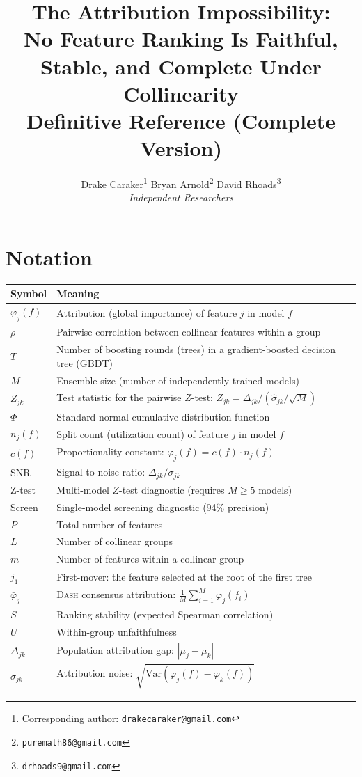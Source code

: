 \documentclass{article}
\title{The Attribution Impossibility:\\{\large No Feature Ranking Is Faithful, Stable, and Complete Under Collinearity}\\[8pt]\normalsize Definitive Reference (Complete Version)}
\author{
  Drake Caraker\thanks{Corresponding author: \texttt{drakecaraker@gmail.com}} \quad
  Bryan Arnold\thanks{\texttt{puremath86@gmail.com}} \quad
  David Rhoads\thanks{\texttt{drhoads9@gmail.com}} \\[4pt]
  \textit{Independent Researchers}
}
\newcommand{\Var}{\mathrm{Var}}
\newcommand{\DASH}{\textsc{Dash}}
\begin{document}
\maketitle
\tableofcontents

\section*{Notation}
\label{sec:notation}
\begin{center}
\small
\begin{tabular}{@{}lp{10cm}@{}}
\toprule
\textbf{Symbol} & \textbf{Meaning} \\
\midrule
$\varphi_j(f)$ & Attribution (global importance) of feature $j$ in model $f$ \\
$\rho$ & Pairwise correlation between collinear features within a group \\
$T$ & Number of boosting rounds (trees) in a gradient-boosted decision tree (GBDT) \\
$M$ & Ensemble size (number of independently trained models) \\
$Z_{jk}$ & Test statistic for the pairwise $Z$-test: $Z_{jk} = \bar\Delta_{jk} / (\hat\sigma_{jk}/\sqrt{M})$ \\
$\Phi$ & Standard normal cumulative distribution function \\
$n_j(f)$ & Split count (utilization count) of feature $j$ in model $f$ \\
$c(f)$ & Proportionality constant: $\varphi_j(f) = c(f) \cdot n_j(f)$ \\
$\text{SNR}$ & Signal-to-noise ratio: $\Delta_{jk}/\sigma_{jk}$ \\
Z-test & Multi-model $Z$-test diagnostic (requires $M \geq 5$ models) \\
Screen & Single-model screening diagnostic (94\% precision) \\
$P$ & Total number of features \\
$L$ & Number of collinear groups \\
$m$ & Number of features within a collinear group \\
$j_1$ & First-mover: the feature selected at the root of the first tree \\
$\bar\varphi_j$ & \DASH{} consensus attribution: $\frac{1}{M}\sum_{i=1}^M \varphi_j(f_i)$ \\
$S$ & Ranking stability (expected Spearman correlation) \\
$U$ & Within-group unfaithfulness \\
$\Delta_{jk}$ & Population attribution gap: $|\mu_j - \mu_k|$ \\
$\sigma_{jk}$ & Attribution noise: $\sqrt{\Var(\varphi_j(f) - \varphi_k(f))}$ \\
\bottomrule
\end{tabular}
\end{center}
\end{document}
